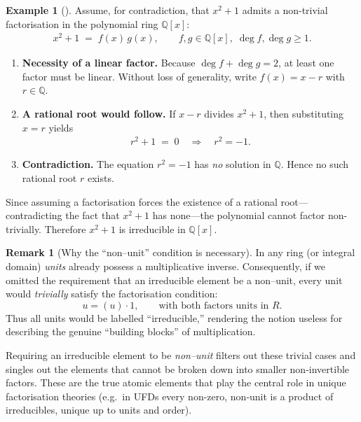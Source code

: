 \documentclass[12pt]{article}
\theoremstyle{definition} %
\newtheorem{remark}{Remark}
\newtheorem{example}{Example}
\theoremstyle{plain} %
\begin{document}
\begin{example}[]
  Assume, for contradiction, that $x^{2}+1$ admits a non-trivial factorisation in the polynomial ring $\mathbb{Q}[x]$:
  \begin{align}
      x^{2}+1 \;=\; f(x)\,g(x), \qquad f,g \in \mathbb{Q}[x], \; \deg f,\deg g \ge 1 .
  \end{align}

  \begin{enumerate}[label=\textbf{Step \arabic*:}]
      \item \textbf{Necessity of a linear factor.}  
            Because $\deg f + \deg g = 2$, at least one factor must be linear.  
            Without loss of generality, write $f(x) = x - r$ with $r \in \mathbb{Q}$.
            
      \item \textbf{A rational root would follow.}  
            If $x - r$ divides $x^{2}+1$, then substituting $x = r$ yields 
            \begin{align}
                r^{2} + 1 \;=\; 0 
                \quad\Longrightarrow\quad
                r^{2} = -1 .
            \end{align}

      \item \textbf{Contradiction.}  
            The equation $r^{2} = -1$ has \emph{no} solution in $\mathbb{Q}$.  
            Hence no such rational root $r$ exists.
  \end{enumerate}

  Since assuming a factorisation forces the existence of a rational root—contradicting the fact that $x^{2}+1$ has none—the polynomial cannot factor non-trivially.  
  Therefore $x^{2}+1$ is irreducible in $\mathbb{Q}[x]$.
\end{example}
\begin{remark}[Why the ``non--unit'' condition is necessary]
  In any ring (or integral domain) \emph{units} already possess a
  multiplicative inverse.  Consequently, if we omitted the requirement
  that an irreducible element be a non--unit, every unit would
  \emph{trivially} satisfy the factorisation condition:
  \[
      u = (u)\cdot 1 ,
      \qquad\text{with both factors units in $R$.}
  \]
  Thus all units would be labelled ``irreducible,'' rendering the
  notion useless for describing the genuine ``building blocks'' of
  multiplication.

  Requiring an irreducible element to be \emph{non--unit} filters out
  these trivial cases and singles out the elements that cannot be
  broken down into smaller non-invertible factors.  These are the
  true atomic elements that play the central role in unique
  factorisation theories (e.g.\ in UFDs every non-zero, non-unit is a
  product of irreducibles, unique up to units and order).
\end{remark}
\end{document}
